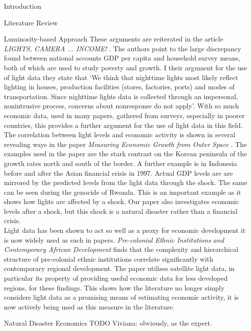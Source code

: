 \documentclass[12pt,fleqn,leqno,letterpaper]{article}
\begin{document}
\begin{section}{Introduction}
\begin{subsection}{Literature Review}
\begin{subsubsection}{Luminosity-based Approach}
      These arguments are reiterated in the article \textit{LIGHTS, CAMERA ... INCOME!}  \cite{lightcamera}. The authors point to the large discrepancy found between national accounts GDP per capita and household survey means, both of which are used to study poverty and growth. I their argument for the use of light data they state that `We think that nighttime lights most likely reflect lighting in houses, production facilities (stores, factories, ports) and modes of transportation. Since nighttime lights data is collected through an impersonal, nonintrusive process, concerns about nonresponse do not apply'. With so much economic data, used in many papers, gathered from surveys, especially in poorer countries, this provides a further argument for the use of light data in this field. \\ 
      The correlation between light levels and economic activity is shown in several revealing ways in the paper \textit{Measuring Economic Growth from Outer Space} \cite{growthlights}. The examples used in the paper are the stark contrast on the Korean peninsula of the growth rates north and south of the border. A further example is in Indonesia before and after the Asian financial crisis in 1997. Actual GDP levels are are mirrored by the predicted levels from the light data through the shock. The same can be seen during the genocide of Rwanda. This is an important example as it shows how lights are affected by a shock. Our paper also investigates economic levels after a shock, but this shock is a natural disaster rather than a financial crisis. \\
      Light data has been shown to act so well as a proxy for economic development it is now widely used as such in papers. \textit{Pre-colonial Ethnic Institutions and Contemporary African Development} \cite{africalights} finds that the complexity and hierarchical structure of pre-colonial ethnic institutions correlate significantly with contemporary regional development. The paper utilises satellite light data, in particular its property of providing useful economic data for less developed regions, for these findings. This shows how the literature no longer simply considers light data as a promising means of estimating economic activity, it is now actively being used as this measure in the literature. 
    \end{subsubsection}
    \begin{subsubsection}{Natural Disaster Economics}
      TODO Viviana: obviously, as the expert.
    \end{subsubsection}
  \end{subsection}
\end{section}
\end{document}
